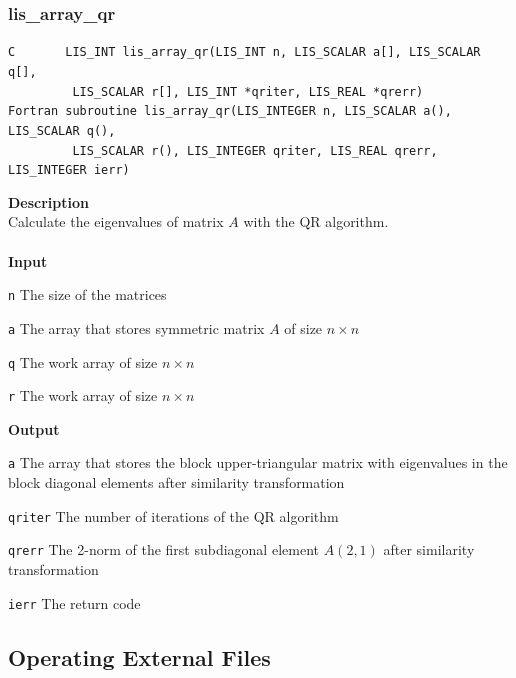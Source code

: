 \documentclass[a4paper]{article}
\newcommand{\namelistlabel}[1]{\mbox{#1}\hfill}
\newenvironment{namelist}[1]{%
\begin{list}{}
  {\let\makelabel\namelistlabel
  \settowidth{\labelwidth}{#1}
  \setlength{\leftmargin}{1.1\labelwidth}}
  }{%
\end{list}}
\begin{document}
\subsubsection{lis\_array\_qr}
\begin{screen}
\verb|C       LIS_INT lis_array_qr(LIS_INT n, LIS_SCALAR a[], LIS_SCALAR q[],|\\
\verb|         LIS_SCALAR r[], LIS_INT *qriter, LIS_REAL *qrerr)|\\
\verb|Fortran subroutine lis_array_qr(LIS_INTEGER n, LIS_SCALAR a(), LIS_SCALAR q(),|\\
\verb|         LIS_SCALAR r(), LIS_INTEGER qriter, LIS_REAL qrerr, LIS_INTEGER ierr)|
\end{screen}
{\bf Description}\\
\indent
Calculate the eigenvalues of matrix $A$ with the QR algorithm.
\\ \\
\noindent
{\bf Input}
\begin{namelist}{XXXXXXXXXXXXXXXXXXXX}
\item[\tt n] The size of the matrices
\item[\tt a] The array that stores symmetric matrix $A$ of size $n \times n$
\item[\tt q] The work array of size $n \times n$
\item[\tt r] The work array of size $n \times n$  
\end{namelist}
{\bf Output}
\begin{namelist}{XXXXXXXXXXXXXXXXXXXX}
\item[\tt a] The array that stores the block upper-triangular matrix with eigenvalues in the block diagonal elements after similarity transformation
\item[\tt qriter] The number of iterations of the QR algorithm
\item[\tt qrerr] The 2-norm of the first subdiagonal element $A(2,1)$ after similarity transformation
\item[\tt ierr] The return code
\end{namelist}

\newpage
\subsection{Operating External Files}
\end{document}
